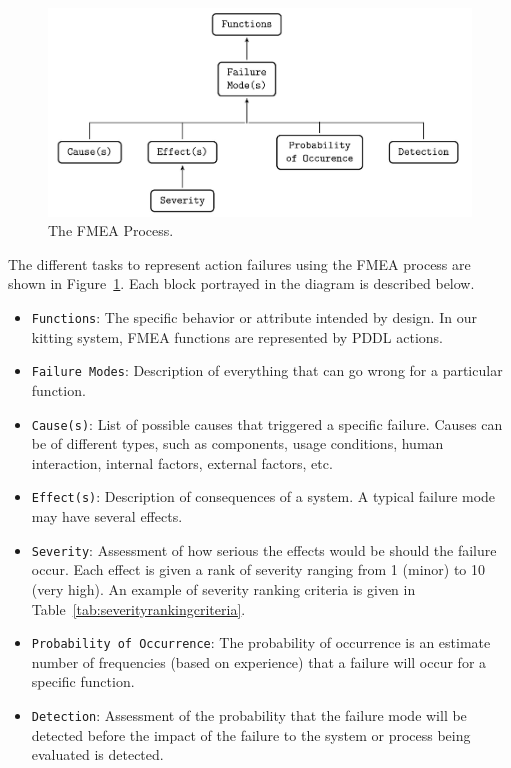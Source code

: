 \begin{figure}[ht!]
\centering
\includegraphics[width=12cm]{images/ActionFailures.pdf}
\caption{The FMEA Process.}
\label{fig:ActionFailures}
\end{figure}

The different tasks to represent action failures using the FMEA process are shown in Figure~\ref{fig:ActionFailures}. Each block portrayed in the diagram is described below.

 \begin{itemize}
   \item \texttt{Functions}: The specific behavior or attribute intended by design. In our kitting system, FMEA functions are represented by PDDL actions.
   \item \texttt{Failure Modes}: Description of everything that can go wrong for a particular function.
   \item \texttt{Cause(s)}: List of possible causes that triggered a specific failure. Causes can be of different types, such as  components, usage conditions, human interaction, internal factors, external factors, etc.
   \item \texttt{Effect(s)}: Description of consequences of a system. A typical failure mode may have several effects.
   \item \texttt{Severity}: Assessment of how serious the effects would be should the failure occur. Each effect is given a rank of severity ranging from 1 (minor) to 10 (very high). An example of severity ranking criteria is given in Table~\ref{tab:severityrankingcriteria}.
   \item \texttt{Probability of Occurrence}: The probability of occurrence is an estimate number of frequencies (based on experience) that a failure will occur for a specific function.
   \item \texttt{Detection}: Assessment of the probability that the failure mode will be detected before the impact
of the failure to the system or process being evaluated is detected.
 \end{itemize}

